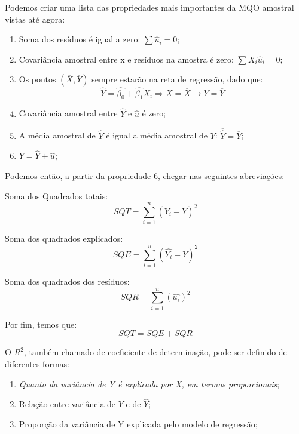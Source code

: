 \documentclass[12pt,a4paper,oneside,brazil]{abntex2}
\begin{document}
Podemos criar uma lista das propriedades mais importantes da MQO amostral vistas até agora:
\begin{enumerate}
\item Soma dos resíduos é igual a zero: $\sum \hat{u}_i = 0$;
\item Covariância amostral entre x e resíduos na amostra é zero: $\sum X_i \hat{u}_i = 0$;
\item Os pontos $( \overline{X}, \overline{Y})$ sempre estarão na reta de regressão, dado que:
\[ \hat{Y} = \hat{\beta_0} + \hat{\beta_1} X_i \Rightarrow X = \overline{X} \rightarrow Y = \overline{Y}\]
\item Covariância amostral entre $\hat{Y}$ e $ \hat{u}$ é zero;
\item A média amostral de $\hat{Y}$ é igual a média amostral de $Y$: $ \overline{\hat{Y}} = \overline{Y}$;
\item $Y = \hat{Y} + \hat{u}$;
\end{enumerate}

Podemos então, a partir da propriedade 6, chegar nas seguintes abreviações: \newline
 
 Soma dos Quadrados totais:
 \begin{equation}\label{SQT}
  SQT = \sum_{i = 1}^{n} ( Y_i - \overline{Y})^2
 \end{equation}
 
 Soma dos quadrados explicados:
  \begin{equation}\label{SQE}
 SQE =	\sum_{i = 1}^{n} ( \hat{Y_i} - \overline{Y})^2
 \end{equation}
 
 Soma dos quadrados dos resíduos:
 \begin{equation} \label{SQR}
 SQR = \sum_{i = 1}^{n} (\hat{u_i})^2
 \end{equation}
 
 Por fim, temos que:
  \begin{equation} \label{SQR}
SQT = SQE + SQR
 \end{equation}
 
 O $R^2$, também chamado de coeficiente de determinação, pode ser definido de diferentes formas:
 \begin{enumerate}
 \item \emph{Quanto da variância de Y é explicada por X, em termos proporcionais};
 \item Relação entre variância de $Y$ e de $\hat{Y}$;
 \item Proporção da variância de Y explicada pelo modelo de regressão;
\end{enumerate} 
 
\end{document}
